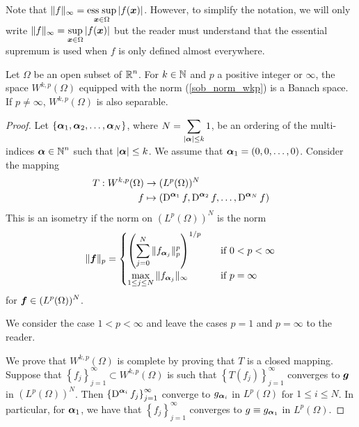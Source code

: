 Note that
$\displaystyle \|f\|_\infty = \operatorname*{ess\;sup}_{{\bm{x}} \in \Omega} |f({\bm{x}})|$.
However, to simplify the notation, we will only write
$\displaystyle \|f\|_\infty = \sup_{{\bm{x}} \in \Omega} |f({\bm{x}})|$
but the reader must understand that the essential supremum is used
when $f$ is only defined almost everywhere.

\begin{theorem}
Let $\Omega$ be an open subset of $\displaystyle \mathbb{R}^n$.  For $k\in \mathbb{N}$ and
$p$ a positive integer or $\infty$, the space
$\displaystyle W^{k,p}(\Omega)$ equipped with
the norm (\ref{sob_norm_wkp}) is a Banach space.  If $p \neq \infty$,
$\displaystyle W^{k,p}(\Omega)$ is also separable.
\end{theorem}

\begin{proof}
Let $\displaystyle \left\{ {\bm{\alpha}}_1, {\bm{\alpha}}_2, \ldots,
{\bm{\alpha}}_N \right\}$,
where $\displaystyle N = \sum_{|{\bm{\alpha}}|\leq k} 1$, be an ordering of
the multi-indices $\displaystyle {\bm{\alpha}} \in \mathbb{N}^n$ such that
$|{\bm{\alpha}}|\leq k$.  We assume that
${\bm{\alpha}}_1 = (0, 0, \ldots, 0)$.  Consider the mapping
\begin{align*}
T: W^{k,p}(\Omega) & \rightarrow (L^p(\Omega))^N \\
f &\mapsto \left( \operatorname{D}^{{\bm{\alpha}}_1} f , \operatorname{D}^{{\bm{\alpha}}_2} f, \ldots,
\operatorname{D}^{{\bm{\alpha}}_N} f \right)
\end{align*}
This is an isometry if the norm on $\displaystyle (L^p(\Omega))^N$ is
the norm
\[
\| {\bm{f}} \|_{p} =
\begin{cases}
\displaystyle \left( \sum_{j=0}^N \| f_{{\bm{\alpha}}_j} \|_p^p \right)^{1/p} &
\quad \text{if} \ 0 < p < \infty \\
\displaystyle \max_{1\leq j \leq N} \| f_{{\bm{\alpha}}_j} \|_\infty &
\quad \text{if} \ p = \infty
\end{cases}
\]
for $\displaystyle {\bm{f}} \in (L^p(\Omega))^N$.

  We consider the case $1<p<\infty$ and leave the cases $p =1$ and
$p=\infty$ to the reader.

We prove that $\displaystyle W^{k,p}(\Omega)$ is complete
by proving that $T$ is a closed mapping. Suppose that
$\displaystyle \left\{f_j \right\}_{j=1}^\infty \subset W^{k,p}(\Omega)$
is such that $\displaystyle \left\{T(f_j) \right\}_{j=1}^\infty$
converges to ${\bm{g}}$ in $\displaystyle (L^p(\Omega))^N$.  Then
$\displaystyle \left\{ \operatorname{D}^{{\bm{\alpha}}_i} f_j \right\}_{j=1}^\infty$
converge to $g_{{\bm{\alpha}}_i}$ in $\displaystyle L^p(\Omega)$ for
$1\leq i \leq N$.  In particular, for ${\bm{\alpha}}_1$, we have that
$\displaystyle \left\{ f_j \right\}_{j=1}^\infty$
converges to $g \equiv g_{{\bm{\alpha}}_1}$ in $\displaystyle L^p(\Omega)$.


\end{proof}
